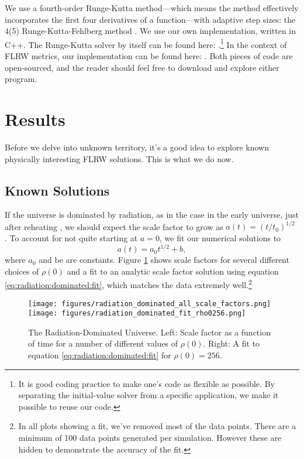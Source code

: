 \documentclass[]{article}
\begin{document}
We use a fourth-order Runge-Kutta method---which means the method
effectively incorporates the first four derivatives of a
function---with adaptive step sizes: the 4(5) Runge-Kutta-Fehlberg
method \cite{Fehlberg}. We use our own implementation, written in
C++. The Runge-Kutta solver by itself can be found here:
\cite{RKF45}.\footnote{It is good coding practice to make one's code as
  flexible as possible. By separating the initial-value solver from a
  specific application, we make it possible to reuse our code.} In the
context of FLRW metrics, our implementation can be found here:
\cite{FLRWCode}. Both pieces of code are open-sourced, and the reader
should feel free to download and explore either program.

\section{Results}
\label{sec:results}

Before we delve into unknown territory, it's a good idea to explore
known physically interesting FLRW solutions. This is what we do
now. 

\subsection{Known Solutions}
\label{subsec:known:solutions}

If the universe is dominated by radiation, as in the case in the early
universe, just after reheating \cite{Kempf}, we should expect the
scale factor to grow as $a(t) = \left(t/t_0\right)^{1/2}$
\cite{Kempf}. To account for not quite starting at $a=0$, we fit our
numerical solutions to
\begin{equation}
  \label{eq:radiation:dominated:fit}
  a(t) = a_0 t^{1/2} + b,
\end{equation}
where $a_0$ and be are constants. Figure \ref{fig:radiation:dominated}
shows scale factors for several different choices of $\rho(0)$ and a
fit to an analytic scale factor solution using equation
\eqref{eq:radiation:dominated:fit}, which matches the data extremely
well.\footnote{In all plots showing a fit, we've removed most of the
  data points. There are a minimum of 100 data points generated per
  simulation. However these are hidden to demonstrate the accuracy of
  the fit.}

\begin{figure}[htb]
  \begin{center}
    \leavevmode
    \hspace{-.2cm}
     \texttt{[image: figures/radiation\_dominated\_all\_scale\_factors.png]}
     \hspace{-0.3cm}
     \texttt{[image: figures/radiation\_dominated\_fit\_rho0256.png]}
     \caption[Radiation Dominated Universe]{The Radiation-Dominated
       Universe. Left: Scale factor as a function of time for a number
       of different values of $\rho(0)$. Right: A fit to equation
       \eqref{eq:radiation:dominated:fit} for $\rho(0)=256$.}
    \label{fig:radiation:dominated}
  \end{center}
\end{figure}
\end{document}

